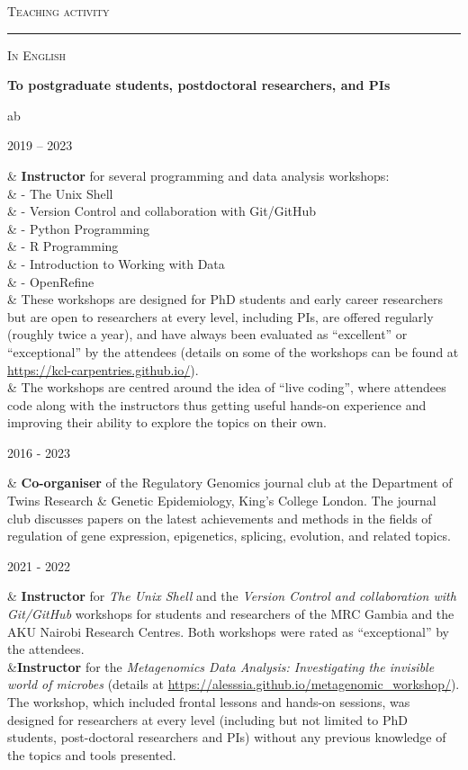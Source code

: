 \documentclass[a4paper,10pt]{article}
\newcommand{\mediumtitle}[1]{
	\vspace{0.2cm}
	{\noindent
	\Large \textsc{#1}\\[-2ex]
	\hrule
	\vspace{0.2cm}}
}
\newcommand{\smalltitle}[1]{
	\vspace{0.1cm}
	{\noindent 
	\large \textsc{#1}}
	\vspace{0.1cm}
}
\newenvironment{singletablelist}
{	\vspace{-0.2cm}
	\begin{longtable}[!h]{ab}}{\end{longtable}
}
\newcommand{\stlist}[2]{
	\hspace{-3cm}
	\noindent
	\begin{minipage}{0.24\textwidth}
	\begin{flushright}
	\textsc{#1}
	\end{flushright}
	\end{minipage}
	& #2\\[0.2cm]
}
\begin{document}
\vspace{0.2cm}

\mediumtitle{Teaching activity}


\smalltitle{In English}

\vspace{0.2cm}

\noindent \textbf{To postgraduate students, postdoctoral researchers, and PIs}

\begin{singletablelist}
	
	\stlist{2019 -- 2023}{\textbf{Instructor} for several programming and data analysis workshops:\\
							& \hskip1cm - The Unix Shell\\
							& \hskip1cm - Version Control and collaboration with Git/GitHub\\
							& \hskip1cm - Python Programming\\
							& \hskip1cm - R Programming\\
							& \hskip1cm - Introduction to Working with Data\\
							& \hskip1cm - OpenRefine\\
							& These workshops are designed for PhD students and early career researchers but are open to researchers at every level, including PIs, are offered regularly (roughly twice a year), and have always been evaluated as ``excellent'' or ``exceptional'' by the attendees (details on some of the workshops can be found at \url{https://kcl-carpentries.github.io/}). \\
							& The workshops are centred around the idea of ``live coding'', where attendees code along with the instructors thus getting useful hands-on experience and improving their ability to explore the topics on their own. }				
	
	\stlist{2016 - 2023}{\textbf{Co-organiser} of the Regulatory Genomics journal club at the Department of Twins Research \& Genetic Epidemiology, King's College London. The journal club discusses papers on the latest achievements and methods in the fields of regulation of gene expression, epigenetics, splicing, evolution, and related topics. }
		
	\stlist{2021 - 2022}{\textbf{Instructor} for \emph{The Unix Shell} and the \emph{Version Control and collaboration with Git/GitHub} workshops for students and researchers of the MRC Gambia and the AKU Nairobi Research Centres. Both workshops were rated as ``exceptional'' by the attendees.  \\
					 &\textbf{Instructor} for the \emph{Metagenomics Data Analysis: Investigating the invisible world of microbes} (details at \url{https://alesssia.github.io/metagenomic_workshop/}). The workshop, which included frontal lessons and hands-on sessions, was designed for researchers at every level (including but not limited to PhD students, post-doctoral researchers and PIs) without any previous knowledge of the topics and tools presented.}

\end{singletablelist}
\end{document}
